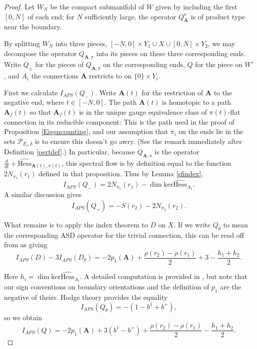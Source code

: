 \documentclass[10pt,a4paper]{amsart}
\theoremstyle{definition}
\theoremstyle{remark}
\numberwithin{figure}{qchap}
\begin{document}
\begin{proof}Let $W_N$ be the compact submanifold of $W$ given by including the first $[0,N]$ of each end; for $N$ sufficiently large, the operator $Q_{\mathbf{A}}^\nu$ is of product type near the boundary.

By splitting $W_N$ into three pieces, $[-N, 0] \times Y_1 \cup X \cup [0, N] \times Y_2$, we may decompose the operator $Q_{\mathbf{A},\pi}$ into its pieces on these three corresponding ends. Write $Q_\pm$ for the pieces of $Q_{\mathbf{A},\pi}$ on the corresponding ends, $Q$ for the piece on $W'$, and $A_i$ the connections $\mathbf{A}$ restricts to on $\{0\} \times Y_i$.

First we calculate $I_{APS}(Q_-)$. Write $\mathbf{A}(t)$ for the restriction of $\mathbf{A}$ to the negative end, where $t \in [-N, 0]$. The path $\mathbf{A}(t)$ is homotopic to a path $\mathbf{A}_f(t)$ so that $\mathbf{A}_f(t)$ is in the unique gauge equivalence class of $\pi(t)$-flat connection in its reducible component: This is the path used in the proof of Proposition \ref{Eigencounting}, and our assumption that $\pi_i$ on the ends lie in the sets $\mathcal P_{E_i, \delta}$ is to ensure this doesn't go awry. (See the remark immediately after Definition \ref{pertdef}.) In particular, because $Q_{\mathbf{A},\pi}$ is the operator $\frac{d}{dt} + \widehat{\text{Hess}}_{\mathbf{A}(t),\pi(t)}$, this spectral flow is by definition equal to the function $2N_{\pi_1}(r_1)$ defined in that proposition. Thus by Lemma \ref{sfindex}, $$I_{APS}(Q_-) = 2N_{\pi_1}(r_1) - \dim \text{ker} \widehat{\text{Hess}}_{A_1}.$$ A similar discussion gives $$I_{APS}(Q_+) = -S(r_2) - 2N_{\pi_2}(r_2).$$

What remains is to apply the index theorem to $D$ on $X$. If we write $Q_\theta$ to mean the corresponding ASD operator for the trivial connection, this can be read off from \cite[Proposition~8.4.1]{morgan1994l2} as giving $$I_{APS}(D) - 3I_{APS}(D_\theta) = -2p_1(\mathbf{A}) + \frac{\rho(r_2) - \rho(r_1)}{2} + 3 - \frac{h_1 + h_2}{2}.$$ 

Here $h_i = \dim \text{ker} \widehat{\text{Hess}}_{A_i}$. A detailed computation is provided in \cite[Proposition~2.6]{hedden2011chern}, but note that our sign conventions on boundary orientations and the definition of $p_1$ are the negative of theirs. Hodge theory provides the equality $$I_{APS}(Q_\theta) = -(1-b^1 + b^+),$$ so we obtain $$I_{APS}(Q)= -2p_1(\mathbf{A}) + 3(b^1-b^+) + \frac{\rho(r_2) - \rho(r_1)}{2} - \frac{h_1 + h_2}{2}.$$


\end{proof}
\end{document}
